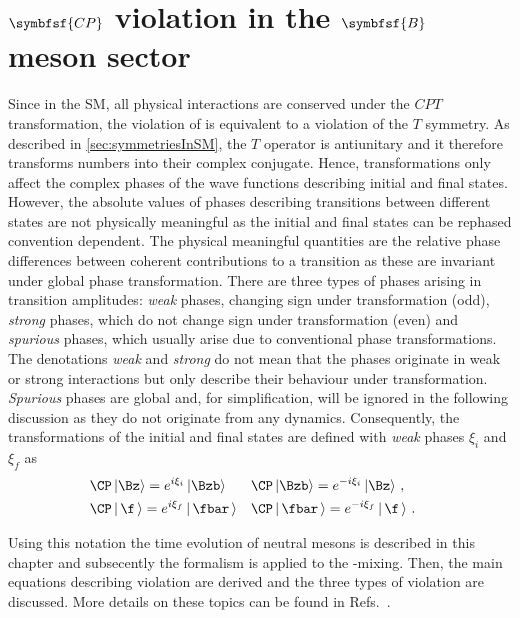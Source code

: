 \chapter[head={\CP violation in the $B$ meson sector},tocentry={$\symbfsf{C{}P}$ violation in the $\symbfsf{B}$ meson sector}]
{$\symbfsf{C{}P}$ violation in the $\symbfsf{B}$ meson sector}
\label{chap:CPV}

\linespread{1.08}\selectfont
Since in the \ac{SM}, all physical interactions are conserved under the $CPT$ transformation, the violation of \CP is equivalent to a violation of the $T$ symmetry.
As described in \cref{sec:symmetriesInSM}, the $T$ operator is antiunitary and it therefore transforms numbers into their complex conjugate.
Hence, \CP transformations only affect the complex phases of the wave functions describing initial and final states.
However, the absolute values of phases describing transitions between different states are not physically meaningful as the initial and final states can be rephased convention dependent.
The physical meaningful quantities are the relative phase differences between coherent contributions to a transition as these are invariant under global phase transformation.
There are three types of phases arising in transition amplitudes:
\emph{weak} phases, changing sign under \CP transformation (\CP odd), \emph{strong} phases, which do not change sign under \CP transformation (\CP even) and \emph{spurious} phases, which usually arise due to conventional phase transformations.
The denotations \emph{weak} and \emph{strong} do not mean that the phases originate in weak or strong interactions but only describe their behaviour under \CP transformation.
\emph{Spurious} phases are global and, for simplification, will be ignored in the following discussion as they do not originate from any dynamics.
Consequently, the \CP transformations of the initial and final states are defined with \emph{weak} phases $\xi_i$ and $\xi_f$ as
\begin{equation}
\begin{aligned}
&\CP\left|\Bz\right> =e^{i\xi_i}\left|\Bzb\right>&&\CP\left|\Bzb\right>=e^{-i\xi_i}\left|\Bz\right>\,,&\\
&\CP\left|\,\f\,\right> =e^{i\xi_f}\left|\,\fbar\,\right>&&\CP\left|\,\fbar\,\right>=e^{-i\xi_f}\left|\,\f\,\right>\,.& \label{eq:CPTransInitFinal}
\end{aligned}
\end{equation}

Using this notation the time evolution of neutral mesons is described in this chapter and subsecently the formalism is applied to the \Bz-\Bzb mixing.
Then, the main equations describing \CP violation are derived and the three types of \CP violation are discussed.
More details on these topics can be found in Refs.~\cite{Branco:396964,Bigi:1295518}.

